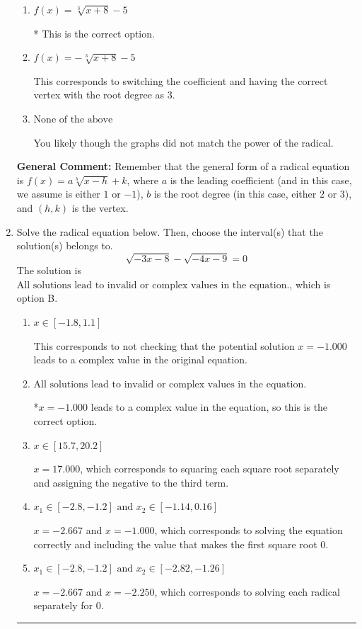 \documentclass{extbook}[14pt]
\newcommand{\litem}[1]{\item #1

\rule{\textwidth}{0.4pt}}
\begin{document}
\begin{enumerate}
{\begin{enumerate}[label=\Alph*.]
This corresponds to the correct coefficient and switching the $x$-value of the vertex with the root degree as $3$.
\item \( f(x) = \sqrt[3]{x + 8} - 5 \)

* This is the correct option.
\item \( f(x) = - \sqrt[3]{x + 8} - 5 \)

This corresponds to switching the coefficient and having the correct vertex with the root degree as $3$.
\item \( \text{None of the above} \)

You likely though the graphs did not match the power of the radical.
\end{enumerate}

\textbf{General Comment:} Remember that the general form of a radical equation is $ f(x) = a \sqrt[b]{x - h} + k$, where $a$ is the leading coefficient (and in this case, we assume is either $1$ or $-1$), $b$ is the root degree (in this case, either $2$ or $3$), and $(h, k)$ is the vertex.
}
\litem{
Solve the radical equation below. Then, choose the interval(s) that the solution(s) belongs to.
\[ \sqrt{-3 x - 8} - \sqrt{-4 x - 9} = 0 \]
The solution is \( \text{All solutions lead to invalid or complex values in the equation.} \), which is option B.\begin{enumerate}[label=\Alph*.]
\item \( x \in [-1.8,1.1] \)

This corresponds to not checking that the potential solution $x = -1.000$ leads to a complex value in the original equation.
\item \( \text{All solutions lead to invalid or complex values in the equation.} \)

*$x = -1.000$ leads to a complex value in the equation, so this is the correct option.
\item \( x \in [15.7,20.2] \)

$x = 17.000$, which corresponds to squaring each square root separately and assigning the negative to the third term.
\item \( x_1 \in [-2.8, -1.2] \text{ and } x_2 \in [-1.14,0.16] \)

$x = -2.667$ and $x = -1.000$, which corresponds to solving the equation correctly and including the value that makes the first square root 0.
\item \( x_1 \in [-2.8, -1.2] \text{ and } x_2 \in [-2.82,-1.26] \)

$x = -2.667$ and $x = -2.250$, which corresponds to solving each radical separately for 0.
\end{enumerate}

}
\end{enumerate}
\end{document}
